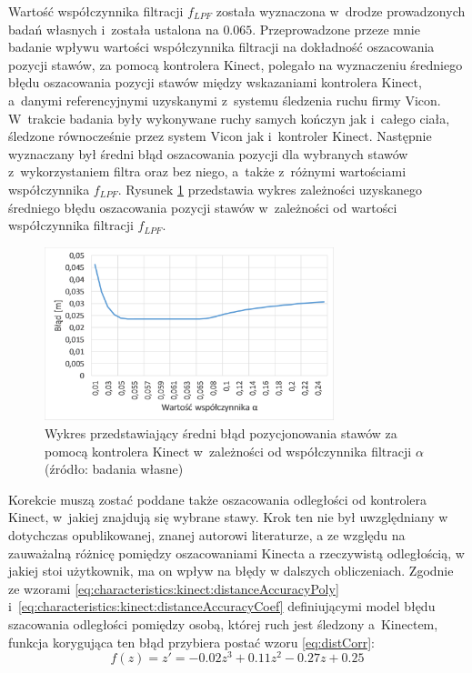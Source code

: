 Wartość współczynnika filtracji $f_{LPF}$ została wyznaczona w~drodze prowadzonych badań własnych i~została ustalona na $0.065$. Przeprowadzone przeze mnie badanie wpływu wartości współczynnika filtracji na dokładność oszacowania pozycji stawów, za pomocą kontrolera Kinect, polegało na wyznaczeniu średniego błędu oszacowania pozycji stawów między wskazaniami kontrolera Kinect, a~danymi referencyjnymi uzyskanymi z~systemu śledzenia ruchu firmy Vicon. W~trakcie badania były wykonywane ruchy samych kończyn jak i~całego ciała, śledzone równocześnie przez system Vicon jak i~kontroler Kinect. Następnie wyznaczany był średni błąd oszacowania pozycji dla wybranych stawów z~wykorzystaniem filtra oraz bez niego, a~także z~różnymi wartościami współczynnika $f_{LPF}$. Rysunek \ref{fig:hybrid:kinect:lpf} przedstawia wykres zależności uzyskanego średniego błędu oszacowania pozycji stawów w~zależności od wartości współczynnika filtracji $f_{LPF}$. 
								
\begin{savenotes}
	\begin{figure}[!htb]
		\centering 
		\includegraphics[width=0.75\textwidth]{images/kinectPosErrorAlpha.png}
		\caption{Wykres przedstawiający średni błąd pozycjonowania stawów za pomocą kontrolera Kinect w~zależności od współczynnika filtracji $\alpha$ (źródło: badania własne)}
		\label{fig:hybrid:kinect:lpf}
	\end{figure}
\end{savenotes}
										
Korekcie muszą zostać poddane także oszacowania odległości od kontrolera Kinect, w~jakiej znajdują się wybrane stawy. Krok ten nie był uwzględniany w dotychczas opublikowanej, znanej autorowi literaturze, a ze względu na zauważalną różnicę pomiędzy oszacowaniami Kinecta a rzeczywistą odległością, w jakiej stoi użytkownik, ma on wpływ na błędy w dalszych obliczeniach. Zgodnie ze wzorami \ref{eq:characteristics:kinect:distanceAccuracyPoly} i~\ref{eq:characteristics:kinect:distanceAccuracyCoef} definiującymi model błędu szacowania odległości pomiędzy osobą, której ruch jest śledzony a~Kinectem, funkcja korygująca ten błąd przybiera postać wzoru \ref{eq:distCorr}:
\begin{equation}
	f(z) = z' = -0.02z^3 + 0.11z^2 - 0.27z + 0.25
	\label{eq:distCorr}
\end{equation}

